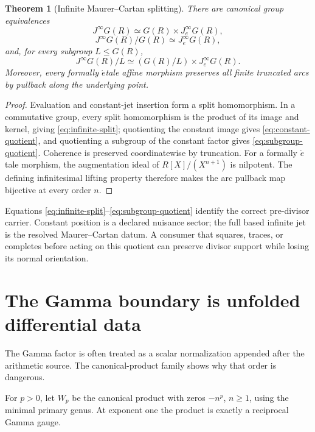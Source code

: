 \documentclass[11pt]{article}
\newtheorem{theorem}{Theorem}[section]
\theoremstyle{definition}
\theoremstyle{remark}
\begin{document}
\begin{theorem}[Infinite Maurer--Cartan splitting]
\label{thm:infinite-jet-split}
There are canonical group equivalences
\[
 J^\infty G(R)
   \simeq G(R)\times J^\infty_eG(R),
\tag{6.5}\label{eq:infinite-split}
\]
\[
 J^\infty G(R)/G(R)
   \simeq J^\infty_eG(R),
\tag{6.6}\label{eq:constant-quotient}
\]
and, for every subgroup \(L\le G(R)\),
\[
 J^\infty G(R)/L
   \simeq (G(R)/L)\times J^\infty_eG(R).
\tag{6.7}\label{eq:subgroup-quotient}
\]
Moreover, every formally \(\acute{e}\)tale affine morphism preserves all
finite truncated arcs by pullback along the underlying point.
\end{theorem}

\begin{proof}
Evaluation and constant-jet insertion form a split homomorphism.  In a
commutative group, every split homomorphism is the product of its image and
kernel, giving \eqref{eq:infinite-split}; quotienting the constant image
gives \eqref{eq:constant-quotient}, and quotienting a subgroup of the
constant factor gives \eqref{eq:subgroup-quotient}.  Coherence is preserved
coordinatewise by truncation.  For a formally \(\acute{e}\)tale morphism,
the augmentation ideal of \(R[X]/(X^{n+1})\) is nilpotent.  The defining
infinitesimal lifting property therefore makes the arc pullback map
bijective at every order \(n\).
\end{proof}

Equations \eqref{eq:infinite-split}--\eqref{eq:subgroup-quotient} identify
the correct pre-divisor carrier.  Constant position is a declared nuisance
sector; the full based infinite jet is the resolved Maurer--Cartan datum.
A consumer that squares, traces, or completes before acting on this quotient
can preserve divisor support while losing its normal orientation.

\section{The Gamma boundary is unfolded differential data}
\label{sec:gamma}

The Gamma factor is often treated as a scalar normalization appended after
the arithmetic source.  The canonical-product family shows why that order
is dangerous.

For \(p>0\), let \(W_p\) be the canonical product with zeros
\(-n^p\), \(n\ge1\), using the minimal primary genus.  At exponent one the
product is exactly a reciprocal Gamma gauge.
\end{document}
